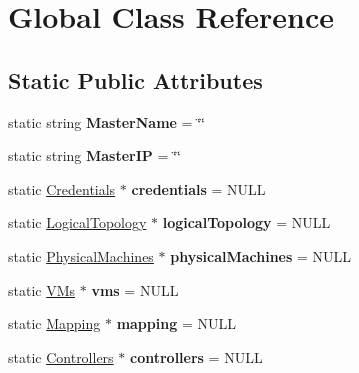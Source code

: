 \hypertarget{classGlobal}{\section{\-Global \-Class \-Reference}
\label{classGlobal}
}
\subsection*{\-Static \-Public \-Attributes}
\begin{DoxyCompactItemize}
\item 
\hypertarget{classGlobal_af52782aa6f1edda005c16554770bd30d}{static string {\bfseries \-Master\-Name} = \char`\"{}\char`\"{}}\label{classGlobal_af52782aa6f1edda005c16554770bd30d}

\item 
\hypertarget{classGlobal_a079919a5e0fbf12860c1e5a2ffa0374f}{static string {\bfseries \-Master\-I\-P} = \char`\"{}\char`\"{}}\label{classGlobal_a079919a5e0fbf12860c1e5a2ffa0374f}

\item 
\hypertarget{classGlobal_a6b54ae0925a0988671eb958b2e0e1d14}{static \hyperlink{classCredentials}{\-Credentials} $\ast$ {\bfseries credentials} = \-N\-U\-L\-L}\label{classGlobal_a6b54ae0925a0988671eb958b2e0e1d14}

\item 
\hypertarget{classGlobal_a23cf81435fcc438384dd428538cd34be}{static \hyperlink{classLogicalTopology}{\-Logical\-Topology} $\ast$ {\bfseries logical\-Topology} = \-N\-U\-L\-L}\label{classGlobal_a23cf81435fcc438384dd428538cd34be}

\item 
\hypertarget{classGlobal_aa92ced342a9666f8641e7d47298b23d3}{static \hyperlink{classPhysicalMachines}{\-Physical\-Machines} $\ast$ {\bfseries physical\-Machines} = \-N\-U\-L\-L}\label{classGlobal_aa92ced342a9666f8641e7d47298b23d3}

\item 
\hypertarget{classGlobal_a9d655048d78a53af2cbb70c5474407cb}{static \hyperlink{classVMs}{\-V\-Ms} $\ast$ {\bfseries vms} = \-N\-U\-L\-L}\label{classGlobal_a9d655048d78a53af2cbb70c5474407cb}

\item 
\hypertarget{classGlobal_ad7683b69f05a87d1089b17de807f2a09}{static \hyperlink{classMapping}{\-Mapping} $\ast$ {\bfseries mapping} = \-N\-U\-L\-L}\label{classGlobal_ad7683b69f05a87d1089b17de807f2a09}

\item 
\hypertarget{classGlobal_aa992a2a86253cba84fb2f8838977a0fb}{static \hyperlink{classControllers}{\-Controllers} $\ast$ {\bfseries controllers} = \-N\-U\-L\-L}\label{classGlobal_aa992a2a86253cba84fb2f8838977a0fb}


\end{DoxyCompactItemize}
